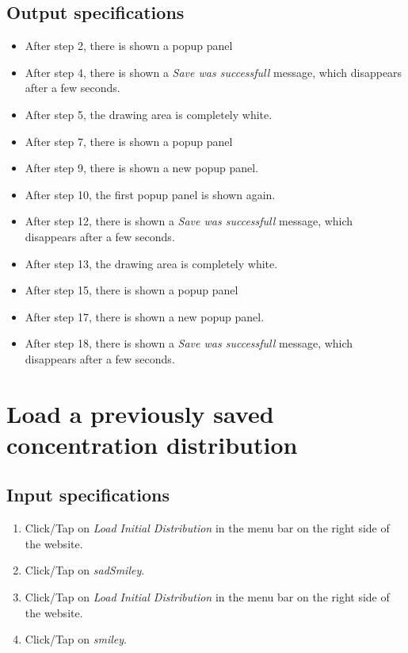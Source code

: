 \subsection*{Output specifications}
\begin{itemize}
\item After step 2, there is shown a popup panel
\item After step 4, there is shown a \emph{Save was successfull} message, which disappears after a few seconds.
\item After step 5, the drawing area is completely white.
\item After step 7, there is shown a popup panel
\item After step 9, there is shown a new popup panel.
\item After step 10, the first popup panel is shown again.
\item After step 12, there is shown a \emph{Save was successfull} message, which disappears after a few seconds.
\item After step 13, the drawing area is completely white.
\item After step 15, there is shown a popup panel
\item After step 17, there is shown a new popup panel.
\item After step 18, there is shown a \emph{Save was successfull} message, which disappears after a few seconds.
\end{itemize}

\section{Load a previously saved concentration distribution}

\subsection*{Input specifications}
\begin{enumerate}
\item Click/Tap on \emph{Load Initial Distribution} in the menu bar on the right side of the website.
\item Click/Tap on \emph{sadSmiley}.
\item Click/Tap on \emph{Load Initial Distribution} in the menu bar on the right side of the website.
\item Click/Tap on \emph{smiley}.
\end{enumerate}

